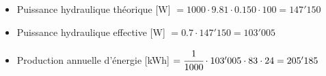 \begin{itemize}
    \item Puissance hydraulique théorique [W] $= 1000 \cdot 9.81 \cdot 0.150 \cdot 100 = 147'150$
    \item Puissance hydraulique effective [W] $= 0.7 \cdot 147'150 = 103'005$
    \item Production annuelle d'énergie [kWh] $= \cfrac{1}{1000}  \cdot 103'005 \cdot 83 \cdot 24 = 205'185$
\end{itemize}